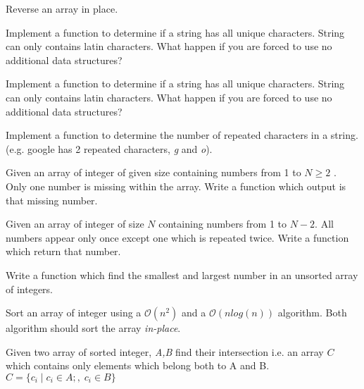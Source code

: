   \begin{problem}
	Reverse an array in place.
 \end{problem}
 
 \begin{problem}
    Implement a function to determine if a string has all unique characters. String can only contains latin 	characters. What happen if you are forced to use no additional data structures?
\end{problem}

 \begin{problem}
    Implement a function to determine if a string has all unique characters. String can only contains latin 	characters. What happen if you are forced to use no additional data structures?
\end{problem}

 \begin{problem}
    Implement a function to determine the number of repeated characters in a string. (e.g. google has 2 repeated characters, \textit{g} and \textit{o}).
\end{problem}

 \begin{problem}
   Given an array of integer of given size containing numbers from 1 to $N \geq 2$ . Only one number is missing within the array. Write a function which output is that missing number.
\end{problem}

 \begin{problem}
   Given an array of integer of size $N$ containing numbers from 1 to $N-2$. All numbers appear only once except one which is repeated twice. Write a function which return that number.
\end{problem}

 \begin{problem}
Write a function which find the smallest and largest number in an unsorted array of integers. 
\end{problem}

 \begin{problem}
	Sort an array of integer using a $\mathcal{O}(n^2)$  and a $\mathcal{O}(nlog(n))$  algorithm. Both algorithm should sort the array \textit{in-place}.
\end{problem}

 \begin{problem}
	Given two array of sorted integer, \textit{A,B} find their intersection i.e. an array $C$ which contains only elements which belong both to A and B. $C=\{c_i \;|\; c_i \in A;,\; c_i \in B\}$
\end{problem}


